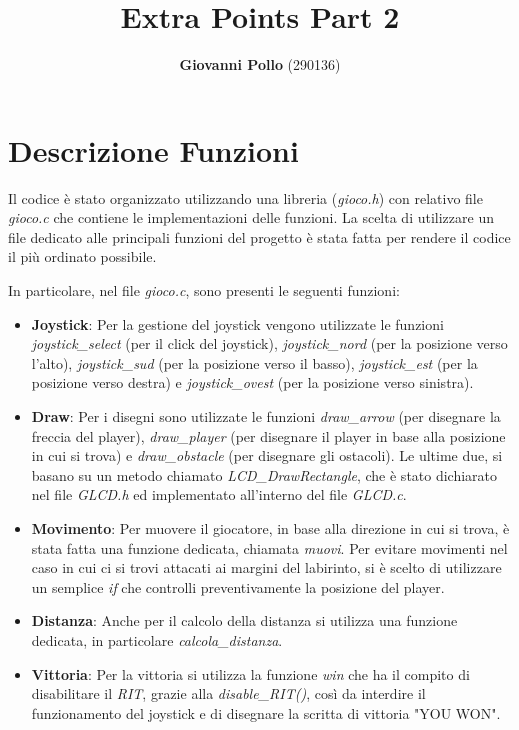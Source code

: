 \documentclass{article}
\title{\huge Extra Points Part 2}
\author{
\Large \textbf{Giovanni Pollo } (290136)}
\date{}
\begin{document}
\begin{titlepage}
  \centering
  \vspace{2px}
\end{titlepage}
\maketitle

\newpage

\section{Descrizione Funzioni}
Il codice è stato organizzato utilizzando una libreria (\emph{gioco.h}) con relativo file \emph{gioco.c} che contiene le implementazioni delle funzioni. La scelta di utilizzare un file dedicato alle principali funzioni del progetto è stata fatta per rendere il codice il più ordinato possibile. 

In particolare, nel file \emph{gioco.c}, sono presenti le seguenti funzioni:
\begin{itemize}
    \item \textbf{Joystick}: Per la gestione del joystick vengono utilizzate le funzioni \emph{joystick\_select} (per il click del joystick), \emph{joystick\_nord} (per la posizione verso l'alto), \emph{joystick\_sud} (per la posizione verso il basso), \emph{joystick\_est} (per la posizione verso destra) e \emph{joystick\_ovest} (per la posizione verso sinistra). 
    \item \textbf{Draw}: Per i disegni sono utilizzate le funzioni \emph{draw\_arrow} (per disegnare la freccia del player), \emph{draw\_player} (per disegnare il player in base alla posizione in cui si trova) e \emph{draw\_obstacle} (per disegnare gli ostacoli). Le ultime due, si basano su un metodo chiamato \emph{LCD\_DrawRectangle}, che è stato dichiarato nel file \emph{GLCD.h} ed implementato all'interno del file \emph{GLCD.c}.
    \item \textbf{Movimento}: Per muovere il giocatore, in base alla direzione in cui si trova, è stata fatta una funzione dedicata, chiamata \emph{muovi}. Per evitare movimenti nel caso in cui ci si trovi attacati ai margini del labirinto, si è scelto di utilizzare un semplice \emph{if} che controlli preventivamente la posizione del player. 
    \item \textbf{Distanza}: Anche per il calcolo della distanza si utilizza una funzione dedicata, in particolare \emph{calcola\_distanza}.
    \item \textbf{Vittoria}: Per la vittoria si utilizza la funzione \emph{win} che ha il compito di disabilitare il \emph{RIT}, grazie alla \emph{disable\_RIT()}, così da interdire il funzionamento del joystick e di disegnare la scritta di vittoria "YOU WON". 
\end{itemize}
\end{document}
